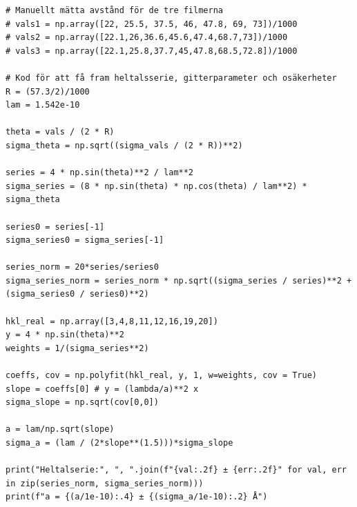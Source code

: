 \documentclass[12pt, a4paper]{article}
\begin{document}
\begin{lstlisting}[style=mypython, label={lst:dataanalys_Debye-Sherrer}]
# Manuellt mätta avstånd för de tre filmerna
# vals1 = np.array([22, 25.5, 37.5, 46, 47.8, 69, 73])/1000
# vals2 = np.array([22.1,26,36.6,45.6,47.4,68.7,73])/1000
# vals3 = np.array([22.1,25.8,37.7,45,47.8,68.5,72.8])/1000

# Kod för att få fram heltalsserie, gitterparameter och osäkerheter
R = (57.3/2)/1000
lam = 1.542e-10

theta = vals / (2 * R)
sigma_theta = np.sqrt((sigma_vals / (2 * R))**2)

series = 4 * np.sin(theta)**2 / lam**2
sigma_series = (8 * np.sin(theta) * np.cos(theta) / lam**2) * sigma_theta

series0 = series[-1]
sigma_series0 = sigma_series[-1]

series_norm = 20*series/series0
sigma_series_norm = series_norm * np.sqrt((sigma_series / series)**2 + (sigma_series0 / series0)**2)

hkl_real = np.array([3,4,8,11,12,16,19,20])
y = 4 * np.sin(theta)**2
weights = 1/(sigma_series**2)

coeffs, cov = np.polyfit(hkl_real, y, 1, w=weights, cov = True)
slope = coeffs[0] # y = (lambda/a)**2 x
sigma_slope = np.sqrt(cov[0,0])

a = lam/np.sqrt(slope)
sigma_a = (lam / (2*slope**(1.5)))*sigma_slope

print("Heltalserie:", ", ".join(f"{val:.2f} ± {err:.2f}" for val, err in zip(series_norm, sigma_series_norm)))
print(f"a = {(a/1e-10):.4} ± {(sigma_a/1e-10):.2} Å")
\end{lstlisting}
\end{document}
